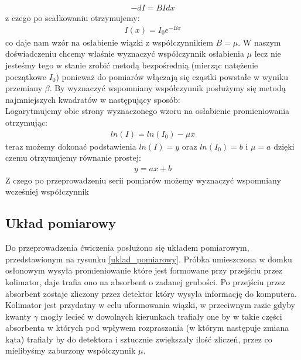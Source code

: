 \documentclass[a4paper]{article}
\begin{document}
\begin{align*}
−dI = B I dx
\end{align*}
z czego po scałkowaniu otrzymujemy:
\begin{align*}
I ( x)=I_0 e^{−B x}
\end{align*}
co daje nam wzór na osłabienie wiązki z współczynnikiem $B = \mu$.
W naszym doświadczeniu chcemy właśnie wyznaczyć współczynnik osłabienia $\mu$ lecz nie jesteśmy tego w stanie zrobić metodą bezpośrednią (mierząc natężenie początkowe $I_0$) ponieważ do pomiarów włączają się cząstki powstałe w wyniku przemiany $\beta$. By wyznaczyć wspomniany współczynnik posłużymy się metodą najmniejszych kwadratów w następujący sposób:\\
Logarytmujemy obie strony wyznaczonego wzoru na osłabienie promieniowania otrzymując:
\begin{align*}
ln( I )=ln( I_0 )−\mu x
\end{align*}
teraz możemy dokonać podstawienia $ln(I) = y$ oraz $ln (I_0 ) =b$ i $\mu = a$ dzięki czemu otrzymujemy równanie prostej:
\begin{align*}
y = ax + b
\end{align*}
Z czego po przeprowadzeniu serii pomiarów możemy wyznaczyć wspomniany wcześniej współczynnik



\subsection{Układ pomiarowy} %
Do przeprowadzenia ćwiczenia posłużono się układem pomiarowym,
przedstawionym na rysunku \ref{uklad_pomiarowy}. Próbka umieszczona w domku osłonowym wysyła promieniowanie które jest formowane przy przejściu przez kolimator, daje trafia ono na absorbent o zadanej grubości. Po przejściu przez absorbent zostaje zliczony przez detektor który wysyła informację do komputera. Kolimator jest przydatny w celu uformowania wiązki, w przeciwnym razie gdyby kwanty $\gamma$ mogły lecieć w dowolnych kierunkach trafiały one by w takie części absorbenta w których pod wpływem rozpraszania (w którym następuje zmiana kąta) trafiały by do detektora i sztucznie zwiększały ilość zliczeń, przez co mielibyśmy zaburzony współczynnik $\mu$.
\end{document}
